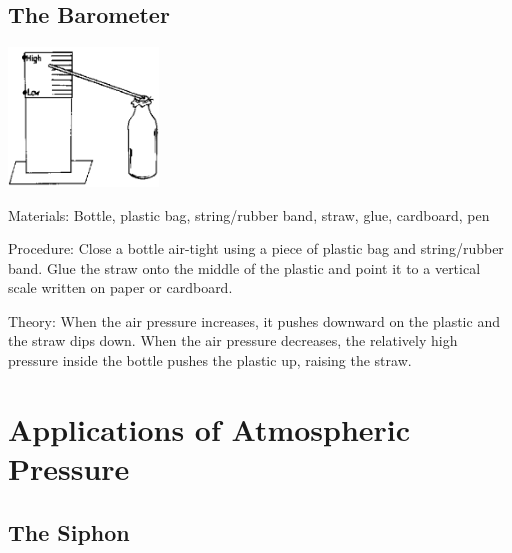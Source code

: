 \begin{multicols}{2}
\subsection{The Barometer}

\begin{center}
\includegraphics[width=0.3\textwidth]{./img/source/barometer.png}
\end{center}

\begin{description*}
\item[Materials:]{Bottle, plastic bag, string/rubber band, straw, glue, cardboard, pen}
\item[Procedure:]{Close a bottle air-tight using a piece of plastic bag and string/rubber band. Glue the straw onto the middle of the plastic and point it to a vertical scale written on paper or cardboard.}
\item[Theory:]{When the air pressure increases, it pushes downward on the plastic and the straw dips down. When the air pressure decreases, the relatively high pressure inside the bottle pushes the plastic up, raising the straw.}
\end{description*}


\section*{Applications of Atmospheric Pressure}


\subsection{The Siphon}


\end{multicols}
